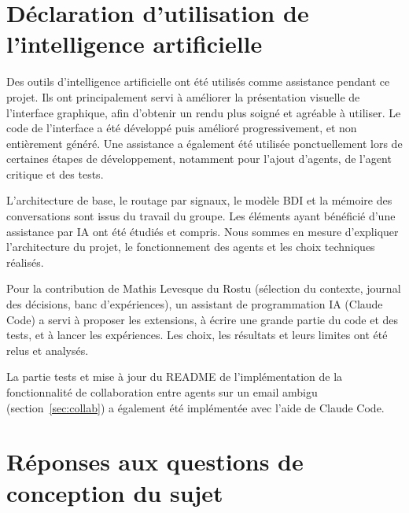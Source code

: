 \documentclass[11pt,a4paper]{article}
\begin{document}
\section*{Déclaration d'utilisation de l'intelligence artificielle}

Des outils d'intelligence artificielle ont été utilisés comme assistance pendant ce projet.
Ils ont principalement servi à améliorer la présentation visuelle de l'interface graphique,
afin d'obtenir un rendu plus soigné et agréable à utiliser. Le code de l'interface a été
développé puis amélioré progressivement, et non entièrement généré. Une assistance a
également été utilisée ponctuellement lors de certaines étapes de développement, notamment
pour l'ajout d'agents, de l'agent critique et des tests.

L'architecture de base, le routage par signaux, le modèle BDI et la mémoire des conversations
sont issus du travail du groupe. Les éléments ayant bénéficié d'une assistance par IA ont
été étudiés et compris. Nous sommes en mesure d'expliquer l'architecture du projet, le
fonctionnement des agents et les choix techniques réalisés.

Pour la contribution de Mathis Levesque du Rostu (sélection du contexte, journal des
décisions, banc d'expériences), un assistant de programmation IA (Claude Code) a servi à
proposer les extensions, à écrire une grande partie du code et des tests, et à lancer les
expériences. Les choix, les résultats et leurs limites ont été relus et analysés.

La partie tests et mise à jour du README de l'implémentation de la fonctionnalité de collaboration entre agents sur un email ambigu (section~\ref{sec:collab}) a également
été implémentée avec l'aide de Claude Code.

\appendix
\section{Réponses aux questions de conception du sujet}
\end{document}
